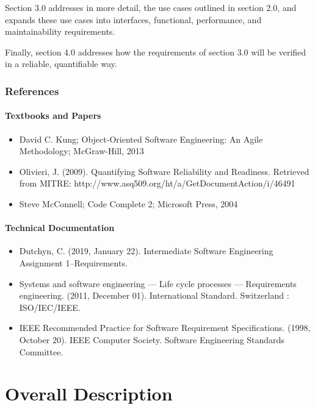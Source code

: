 \documentclass[12pt]{article}
\begin{document}
Section 3.0 addresses in more detail, the use cases outlined
in section 2.0, and expands these use cases
into interfaces, functional, performance, and
maintainability requirements.

Finally, section 4.0 addresses how the requirements of section 3.0 will be
verified in a reliable, quantifiable way.

\section{References}
\subsection{Textbooks and Papers}
\begin{itemize}
\item David C. Kung; Object-Oriented Software Engineering: An Agile Methodology; McGraw-Hill, 2013

\item Olivieri, J. (2009). Quantifying Software Reliability and Readiness. 
        Retrieved from MITRE: http://www.asq509.org/ht/a/GetDocumentAction/i/46491
        
\item Steve McConnell; Code Complete 2; Microsoft Press, 2004
\end{itemize}

\subsection{Technical Documentation}
\begin{itemize}
\item Dutchyn, C. (2019, January 22). Intermediate Software Engineering Assignment 1–Requirements.

\item Systems and software engineering — Life cycle processes — Requirements engineering. 
        (2011, December 01). International Standard. Switzerland : ISO/IEC/IEEE.
        
\item IEEE Recommended Practice for Software Requirement Specifications. (1998, October 20). 
        IEEE Computer Society. Software Engineering Standards Committee.
\end{itemize}

\newpage
\part{Overall Description}
\setcounter{section}{0}
\end{document}
